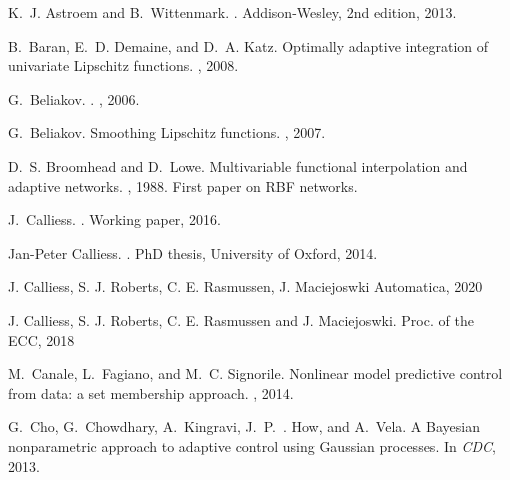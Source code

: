 \documentclass{article} %
\theoremstyle{definition}
\theoremstyle{remark}
\begin{document}
\begin{thebibliography}{10}
	
	K.~J. Astroem and B.~Wittenmark.
	.
	\newblock Addison-Wesley, 2nd edition, 2013.
	
	B.~Baran, E.~D. Demaine, and D.~A. Katz.
	\newblock Optimally adaptive integration of univariate {Lipschitz} functions.
	, 2008.
	
	G.~Beliakov.
	.
	, 2006.
	
	G.~Beliakov.
	\newblock Smoothing {Lipschitz} functions.
	, 2007.
	
	D.~S. Broomhead and D.~Lowe.
	\newblock Multivariable functional interpolation and adaptive networks.
	, 1988.
	\newblock First paper on RBF networks.
	
	J.~Calliess.
	.
	\newblock Working paper, 2016.
	
	Jan-Peter Calliess.
	.
	\newblock PhD thesis, University of Oxford, 2014.
	
	J. Calliess, S. J. Roberts, C. E. Rasmussen, J. Maciejoswki  Automatica, 2020
	
	 J. Calliess, S. J. Roberts, C. E. Rasmussen and J. Maciejoswki.  Proc. of the ECC, 2018
	
	M.~Canale, L.~Fagiano, and M.~C. Signorile.
	\newblock Nonlinear model predictive control from data: a set membership
	approach.
	, 2014.
	
	G.~Cho, G.~Chowdhary, A.~Kingravi, J.~P.~. How, and A.~Vela.
	\newblock A {Bayesian} nonparametric approach to adaptive control using
	{Gaussian} processes.
	\newblock In {\em CDC}, 2013.
	

\end{thebibliography}
\end{document}

